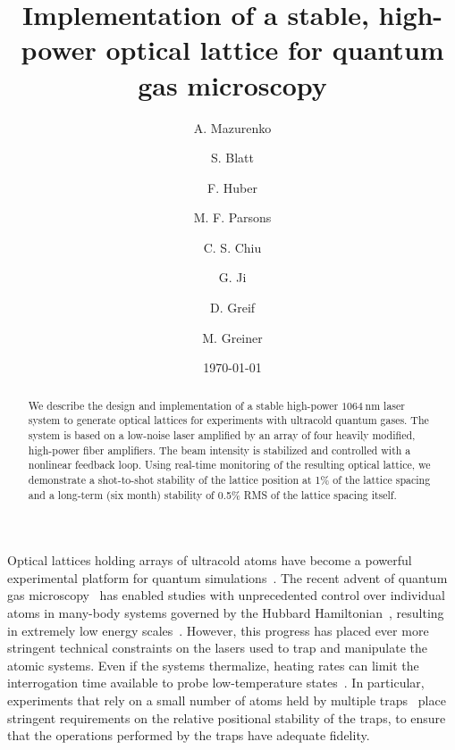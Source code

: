 \documentclass[twocolumn,aps,pra,showpacs,preprintnumbers,bibnotes]{revtex4-1}
\newcommand\unit[2]{\ensuremath{#1~\mathrm{{#2}}}}
\begin{document}
\title{Implementation of a stable, high-power optical lattice for quantum gas microscopy}

\author{A. Mazurenko}
\author{S. Blatt}
\author{F. Huber}
\author{M. F. Parsons}
\author{C. S. Chiu}
\author{G. Ji}
\author{D. Greif}
\author{M. Greiner}

\date{\today}
\begin{abstract}
  We describe the design and implementation of a stable high-power \unit{1064}{nm} laser system to generate optical lattices for experiments with ultracold quantum gases. The system is based on a low-noise laser amplified by an array of four heavily modified, high-power fiber amplifiers. The beam intensity is stabilized and controlled with a nonlinear feedback loop. Using real-time monitoring of the resulting optical lattice, we demonstrate a shot-to-shot stability of the lattice position at 1\% of the lattice spacing and a long-term (six month) stability of 0.5\% RMS of the lattice spacing itself.
\end{abstract}
\maketitle

Optical lattices holding arrays of ultracold atoms have become a powerful experimental platform for quantum simulations~\cite{Friedenauer2008, Kim2010, Struck2011, Simon2011, Yan2013, Greif2013, Drewes2016, Murmann2015}.
The recent advent of quantum gas microscopy~\cite{Bakr2009, Sherson2010, Haller2015, Cheuk2015, Parsons2015, Edge2015, Omran2015, Greif2016, Cheuk2016, Parsons2016, Boll2016, Cheuk2016a, Brown2017} has enabled studies with unprecedented control over individual atoms in many-body systems governed by the Hubbard Hamiltonian~\cite{Hubbard1963}, resulting in extremely low energy scales~\cite{Mazurenko2017}.
However, this progress has placed ever more stringent technical constraints on the lasers used to trap and manipulate the atomic systems.
Even if the systems thermalize, heating rates can limit the interrogation time available to probe low-temperature states~\cite{Blatt2015}.
In particular, experiments that rely on a small number of atoms held by multiple traps~\cite{Preiss2015, Choi2016, Mazurenko2017} place stringent requirements on the relative positional stability of the traps, to ensure that the operations performed by the traps have adequate fidelity.
\end{document}
